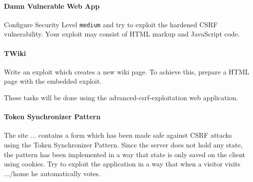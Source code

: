 \documentclass{./handout}
\begin{document}
\begin{subtask}
\paragraph{Damn Vulnerable Web App}
Configure Security Level \texttt{medium} and try to exploit the hardened 
CSRF vulnerability.
Your exploit may consist of HTML markup and JavaScript code.
\end{subtask}

\begin{subtask}
\paragraph{TWiki}
Write an exploit which creates a new wiki page. To achieve this, prepare 
a HTML page with the embedded exploit. 
\end{subtask}


These tasks will be done using the advanced-csrf-exploitation web application.

\begin{subtask}
\paragraph{Token Synchronizer Pattern}
The site ... contains a form which has been made safe against CSRF attacks
using the Token Synchronizer Pattern.
Since the server does not hold any state, the pattern has been implemented
in a way that state is only saved on the client using cookies. 
Try to exploit the application in a way that when a visitor visits .../home
he automatically votes.

%
\end{subtask}
\end{document}
